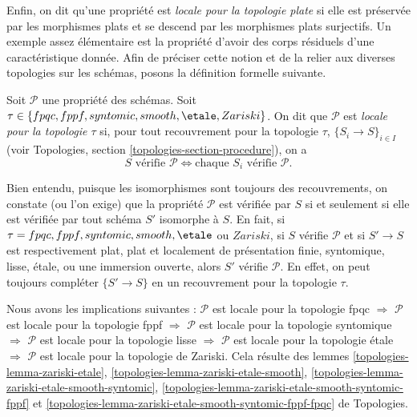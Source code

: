 \medskip\noindent
Enfin, on dit qu'une propriété est {\it locale pour la topologie plate}
si elle est préservée par les morphismes plats et se descend par les
morphismes plats surjectifs. Un exemple assez élémentaire est la propriété d'avoir des corps
résiduels d'une caractéristique donnée. Afin de préciser cette notion et de
la relier aux diverses topologies sur les schémas, posons la définition
formelle suivante.

\begin{definition}
\label{definition-property-local}
Soit $\mathcal{P}$ une propriété des schémas. Soit
$\tau \in \{fpqc, \linebreak[0] fppf, \linebreak[0] syntomic, \linebreak[0]
smooth, \linebreak[0] \etale, \linebreak[0] Zariski\}$. On dit que
$\mathcal{P}$ est {\it locale pour la topologie $\tau$} si, pour tout
recouvrement pour la topologie $\tau$, $\{S_i \to S\}_{i \in I}$ (voir
Topologies, section \ref{topologies-section-procedure}), on a
$$
S \text{ vérifie }\mathcal{P}
\Leftrightarrow
\text{chaque }S_i \text{ vérifie }\mathcal{P}.
$$
\end{definition}

\noindent
Bien entendu, puisque les isomorphismes sont toujours des recouvrements,
on constate (ou l'on exige) que la propriété $\mathcal{P}$ est vérifiée par
$S$ si et seulement si elle est vérifiée par tout schéma $S'$ isomorphe à
$S$. En fait, si
$\tau = fpqc, \linebreak[0] fppf, \linebreak[0] syntomic,
\linebreak[0] smooth, \linebreak[0] \etale$ ou $Zariski$, si $S$ vérifie
$\mathcal{P}$ et si $S' \to S$ est respectivement plat, plat et localement
de présentation finie, syntomique, lisse, \'etale, ou une immersion ouverte,
alors $S'$ vérifie $\mathcal{P}$. En effet, on peut toujours compléter
$\{S' \to S\}$ en un recouvrement pour la topologie $\tau$.

\medskip\noindent
Nous avons les implications suivantes :
$\mathcal{P}$ est locale pour la topologie fpqc
$\Rightarrow$
$\mathcal{P}$ est locale pour la topologie fppf
$\Rightarrow$
$\mathcal{P}$ est locale pour la topologie syntomique
$\Rightarrow$
$\mathcal{P}$ est locale pour la topologie lisse
$\Rightarrow$
$\mathcal{P}$ est locale pour la topologie \'etale
$\Rightarrow$
$\mathcal{P}$ est locale pour la topologie de Zariski.
Cela résulte des lemmes
\ref{topologies-lemma-zariski-etale},
\ref{topologies-lemma-zariski-etale-smooth},
\ref{topologies-lemma-zariski-etale-smooth-syntomic},
\ref{topologies-lemma-zariski-etale-smooth-syntomic-fppf} et
\ref{topologies-lemma-zariski-etale-smooth-syntomic-fppf-fpqc} de Topologies.

